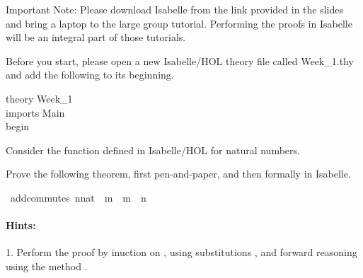 %
\begin{isabellebody}%
%
%
\isadelimtheory
%
\endisadelimtheory
%
\isatagtheory
%
\endisatagtheory
{\isafoldtheory}%
%
\isadelimtheory
%
\endisadelimtheory
%
\begin{isamarkuptext}%
%
\end{isamarkuptext}\isamarkuptrue%
%
\begin{isamarkuptext}%
Important Note: Please download Isabelle from the link provided in the slides and bring a 
      laptop to the large group tutorial. Performing the proofs in Isabelle will be an integral part
      of those tutorials.%
\end{isamarkuptext}\isamarkuptrue%
%
\begin{isamarkuptext}%
Before you start, please open a new Isabelle/HOL theory file called Week\_1.thy and add the
       following to its beginning.

\noindent theory Week\_1\\
imports Main\\
begin%
\end{isamarkuptext}\isamarkuptrue%
%
\begin{isamarkuptext}%
%
\end{isamarkuptext}\isamarkuptrue%
%
\begin{isamarkuptext}%
Consider the function \isa{{\isacharparenleft}{\kern0pt}{\isacharplus}{\kern0pt}{\isacharparenright}{\kern0pt}} defined in Isabelle/HOL for natural numbers.

Prove the following theorem, first pen-and-paper, and then formally in Isabelle.%
\end{isamarkuptext}\isamarkuptrue%
\isamarkupfalse%
\ add{\isacharunderscore}{\kern0pt}commutes{\isacharcolon}{\kern0pt}\ {\isachardoublequoteopen}{\isacharparenleft}{\kern0pt}n{\isacharcolon}{\kern0pt}{\isacharcolon}{\kern0pt}nat{\isacharparenright}{\kern0pt}\ {\isacharplus}{\kern0pt}\ m\ {\isacharequal}{\kern0pt}\ m\ {\isacharplus}{\kern0pt}\ n{\isachardoublequoteclose}%
\begin{isamarkuptext}%
\paragraph{Hints:} 

 1. Perform the proof by inuction on , using substitutions , and forward reasoning using
   the method .


\end{isamarkuptext}
\end{isabellebody}
